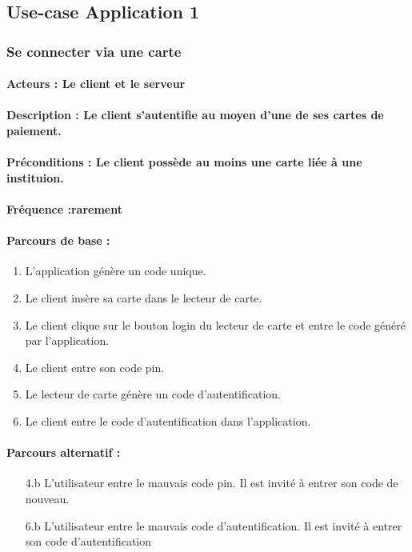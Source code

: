 \documentclass[../annexe.tex]{subfiles}
\begin{document}
\subsection{Use-case Application 1}	

\subsubsection{Se connecter via une carte}
\paragraph{Acteurs : Le client et le serveur}
\paragraph{Description : Le client s'autentifie au moyen d'une de ses cartes de paiement.}
\paragraph{Préconditions : Le client possède au moins une carte liée à une instituion.}
\paragraph{Fréquence :rarement}
\paragraph{Parcours de base :}
\begin{enumerate}
	\item{L'application génère un code unique.}
	\item{Le client insère sa carte dans le lecteur de carte.}
	\item{Le client clique sur le bouton login du lecteur de carte et entre le code généré par l'application.}
	\item{Le client entre son code pin.}
	\item{Le lecteur de carte génère un code d'autentification.}
	\item{Le client entre le code d'autentification dans l'application.}
\end{enumerate}
\paragraph{Parcours alternatif :}
\begin{itemize}
	\item[4.b]{L'utilisateur entre le mauvais code pin. Il est invité à entrer son code de nouveau.}
	\item[6.b]{L'utilisateur entre le mauvais code d'autentification. Il est invité à entrer son code d'autentification}
\end{itemize}
\end{document}
